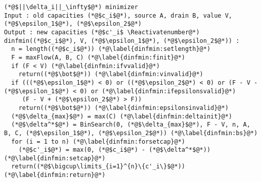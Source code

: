 \Suppressnumber
\begin{lstlisting}[label=dinf, style=numbers]
(*@$||\delta_i||_\infty$@*) minimizer
Input : old capacities (*@$c_i$@*), source A, drain B, value V, (*@$\epsilon_1$@*), (*@$\epsilon_2$@*)
Output : new capacities (*@$c'_i$ \Reactivatenumber@*)
dinfmin((*@$c_i$@*), V, (*@$\epsilon_1$@*), (*@$\epsilon_2$@*)) :
  n = length((*@$c_i$@*)) (*@\label{dinfmin:setlength}@*)
  F = maxFlow(A, B, C) (*@\label{dinfmin:finit}@*)
  if (F < V) (*@\label{dinfmin:ifvvalid}@*)
    return((*@$\bot$@*)) (*@\label{dinfmin:vinvalid}@*)
  if (((*@$\epsilon_1$@*) < 0) or ((*@$\epsilon_2$@*) < 0) or (F - V - (*@$\epsilon_1$@*) < 0) or (*@\label{dinfmin:ifepsilonsvalid}@*)
     (F - V + (*@$\epsilon_2$@*) > F))
    return((*@$\bot$@*)) (*@\label{dinfmin:epsilonsinvalid}@*)
  (*@$\delta_{max}$@*) = max(C) (*@\label{dinfmin:deltainit}@*)
  (*@$\delta^*$@*) = BinSearch(0, (*@$\delta_{max}$@*), F - V, n, A, B, C, (*@$\epsilon_1$@*), (*@$\epsilon_2$@*)) (*@\label{dinfmin:bs}@*)
  for (i = 1 to n) (*@\label{dinfmin:forsetcap}@*)
    (*@$c'_i$@*) = max(0, (*@$c_i$@*) - (*@$\delta^*$@*)) (*@\label{dinfmin:setcap}@*)
  return((*@$\bigcup\limits_{i=1}^{n}\{c'_i\}$@*)) (*@\label{dinfmin:return}@*)
\end{lstlisting}
